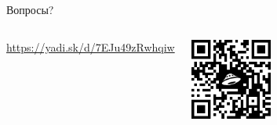 \begin{frame}[fragile]{Вопросы?}
    \setcounter{tocdepth}{2}
    \tableofcontents

    \bigskip

    \begin{columns}
            \url{https://yadi.sk/d/7EJu49zRwhqiw}
        \begin{center}
            \includegraphics[width=0.7\textwidth]{url-qr-2016}
        \end{center}
    \end{columns}
\end{frame}

